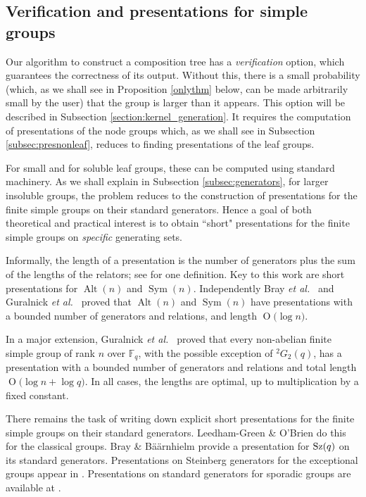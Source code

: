 \documentclass[12pt,twoside,reqno,psamsfonts]{amsproc}
\newcommand{\comment}[1]{\marginpar{\begin{center}\scriptsize{#1}\end{center}}}
\numberwithin{equation}{section}
\numberwithin{figure}{section}
\newcounter{algorithm}
\theoremstyle{plain}
\theoremstyle{definition}
\theoremstyle{remark}
\providecommand{\Sym}[1]{\operatorname{Sym}( #1 )}
\providecommand{\Alt}[1]{\operatorname{Alt}( #1 )}
\newcommand{\field}[1]{\mathbb{#1}}
\newcommand{\F}{\field{F}}
\newcommand{\OR}[1]{\operatorname{O} \bigl( #1 \bigr)}
\begin{document}
\subsection{Verification and presentations for simple groups}
\label{sec:presentations}
Our algorithm to construct a composition tree has a {\em verification}
option, which guarantees the correctness of its output.
\comment{DFH: Added first paragraph}
Without this, there is a small probability
(which, as we shall see in Proposition \ref{onlythm} below, can be made
arbitrarily small by the user) that the group is larger than it appears.
This option will be described in Subsection \ref{section:kernel_generation}.
It requires the computation of presentations of
the node groups which, as we shall see in Subsection \ref{subsec:presnonleaf},
reduces to finding presentations of the leaf groups.

For small and for soluble leaf groups, these can be computed using standard
machinery. As we shall explain in Subsection \ref{subsec:generators},
for larger insoluble groups, the problem reduces to the construction of
presentations for the finite simple groups on their standard generators.
Hence a goal of both theoretical and practical interest is to obtain
``short" presentations for the finite simple
groups on {\it specific} generating sets. 

Informally, the length of a presentation is the number
of generators plus the sum of the lengths of the relators;
see \cite{MR2393425} for one definition. 
Key to this work are short presentations for $\Alt{n}$ and $\Sym{n}$.
Independently Bray {\it et al.\ }\cite{alt_sym_short_pres}
and Guralnick {\it et al.\ }\cite{MR2393425}
proved that $\Alt{n}$ and $\Sym{n}$ have presentations with a bounded number
of generators and relations, and length $\OR{\log n}$.

In a major extension, Guralnick {\it et al.\ }\cite{MR2393425} proved that
every non-abelian finite simple group of rank $n$ over $\F_q$,
with the possible exception of $^2G_2(q)$,
has a presentation with a bounded number of generators
and relations and total length $\OR{\log n + \log q}$.
In all cases, the lengths are optimal, up to multiplication by a fixed constant.

There remains the task of
writing down explicit short presentations for the finite simple groups
on their standard generators.  Leedham-Green \& O'Brien \cite{pres}
do this for the classical groups.  Bray \& B{\"a}{\"a}rnhielm 
\cite{sz_blackbox} provide a presentation 
for ${\rm Sz}(q)$ on its standard generators.
Presentations on Steinberg generators 
for the exceptional groups appear in \cite{Babaietal97}.
Presentations on standard generators for 
sporadic groups are available at \cite{atlas_www}.
\end{document}
